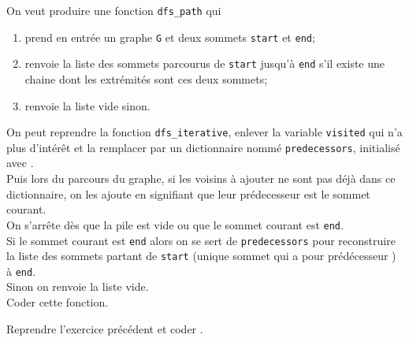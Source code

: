 \documentclass[a4paper,12pt,french]{book}
\begin{document}
\begin{exercice}
On veut produire une fonction \texttt{dfs\_path} qui
\begin{enumerate}[--]
	\item prend en entrée un graphe \texttt{G} et deux sommets \texttt{start} et \texttt{end};
    \item renvoie la liste des sommets parcourus de \texttt{start} jusqu'à \texttt{end} s'il existe une chaine dont les extrémités sont ces deux sommets;
    \item renvoie la liste vide sinon.
\end{enumerate}
On peut reprendre la fonction \texttt{dfs\_iterative}, enlever la variable \texttt{visited} qui n'a plus d'intérêt et la remplacer par un dictionnaire nommé \texttt{predecessors}, initialisé avec .\\
Puis lors du parcours du graphe, si les voisins à ajouter ne sont pas déjà dans ce dictionnaire, on les ajoute en signifiant que leur prédecesseur est le sommet courant.\\
On s'arrête dès que la pile est vide ou que le sommet courant est \texttt{end}.\\
Si le sommet courant est \texttt{end} alors on se sert de \texttt{predecessors} pour reconstruire la liste des sommets partant de \texttt{start} (unique sommet qui a pour prédécesseur ) à \texttt{end}.\\
Sinon on renvoie la liste vide.\\

Coder cette fonction.
\end{exercice}

\begin{exercice}
Reprendre l'exercice précédent et coder .
\end{exercice}
\end{document}
